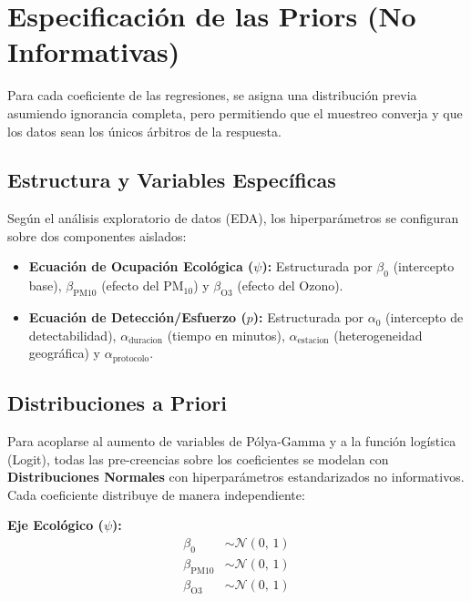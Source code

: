 \documentclass[12pt, a4paper]{article}
\begin{document}
\section{Especificación de las Priors (No Informativas)}

Para cada coeficiente de las regresiones, se asigna una distribución previa asumiendo ignorancia completa, pero permitiendo que el muestreo converja y que los datos sean los únicos árbitros de la respuesta.

\subsection{Estructura y Variables Específicas}

Según el análisis exploratorio de datos (EDA), los hiperparámetros se configuran sobre dos componentes aislados:

\begin{itemize}
  \item \textbf{\textcolor{ecogreen}{Ecuación de Ocupación Ecológica ($\psi$):}} Estructurada por $\beta_0$ (intercepto base), $\beta_{\text{PM10}}$ (efecto del $\text{PM}_{10}$) y $\beta_{\text{O3}}$ (efecto del Ozono).
  \item \textbf{\textcolor{humanred}{Ecuación de Detección/Esfuerzo ($p$):}} Estructurada por $\alpha_0$ (intercepto de detectabilidad), $\alpha_{\text{duracion}}$ (tiempo en minutos), $\alpha_{\text{estacion}}$ (heterogeneidad geográfica) y $\alpha_{\text{protocolo}}$.
\end{itemize}

\subsection{Distribuciones a Priori}

Para acoplarse al aumento de variables de Pólya-Gamma y a la función logística (Logit), todas las pre-creencias sobre los coeficientes se modelan con \textbf{Distribuciones Normales} con hiperparámetros estandarizados no informativos. Cada coeficiente distribuye de manera independiente:

\medskip
\textbf{\textcolor{ecogreen}{Eje Ecológico ($\psi$):}}
\begin{align}
  \beta_0 &\sim \mathcal{N}(0,\, 1) \\
  \beta_{\text{PM10}} &\sim \mathcal{N}(0,\, 1) \\
  \beta_{\text{O3}} &\sim \mathcal{N}(0,\, 1)
\end{align}
\end{document}
